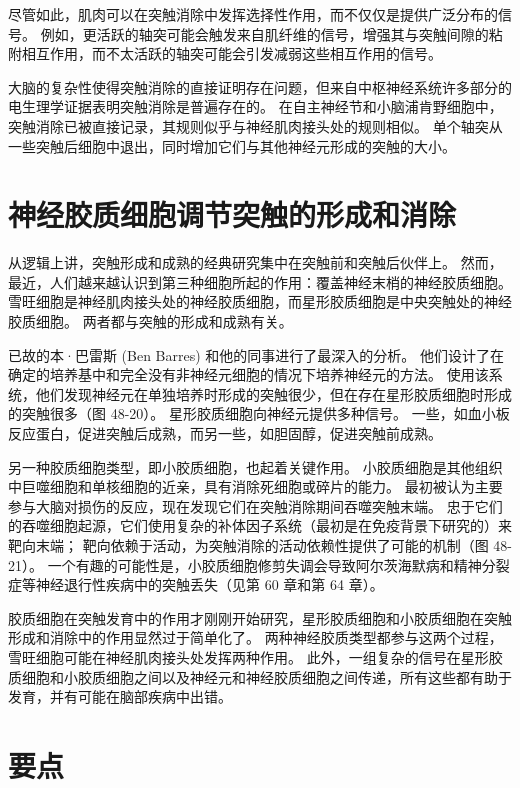 尽管如此，肌肉可以在突触消除中发挥选择性作用，而不仅仅是提供广泛分布的信号。 例如，更活跃的轴突可能会触发来自肌纤维的信号，增强其与突触间隙的粘附相互作用，而不太活跃的轴突可能会引发减弱这些相互作用的信号。

大脑的复杂性使得突触消除的直接证明存在问题，但来自中枢神经系统许多部分的电生理学证据表明突触消除是普遍存在的。 在自主神经节和小脑浦肯野细胞中，突触消除已被直接记录，其规则似乎与神经肌肉接头处的规则相似。 单个轴突从一些突触后细胞中退出，同时增加它们与其他神经元形成的突触的大小。

\section{神经胶质细胞调节突触的形成和消除}
从逻辑上讲，突触形成和成熟的经典研究集中在突触前和突触后伙伴上。 然而，最近，人们越来越认识到第三种细胞所起的作用：覆盖神经末梢的神经胶质细胞。 雪旺细胞是神经肌肉接头处的神经胶质细胞，而星形胶质细胞是中央突触处的神经胶质细胞。 两者都与突触的形成和成熟有关。

已故的本·巴雷斯 (Ben Barres) 和他的同事进行了最深入的分析。 他们设计了在确定的培养基中和完全没有非神经元细胞的情况下培养神经元的方法。 使用该系统，他们发现神经元在单独培养时形成的突触很少，但在存在星形胶质细胞时形成的突触很多（图 48-20）。 星形胶质细胞向神经元提供多种信号。 一些，如血小板反应蛋白，促进突触后成熟，而另一些，如胆固醇，促进突触前成熟。

另一种胶质细胞类型，即小胶质细胞，也起着关键作用。 小胶质细胞是其他组织中巨噬细胞和单核细胞的近亲，具有消除死细胞或碎片的能力。 最初被认为主要参与大脑对损伤的反应，现在发现它们在突触消除期间吞噬突触末端。 忠于它们的吞噬细胞起源，它们使用复杂的补体因子系统（最初是在免疫背景下研究的）来靶向末端； 靶向依赖于活动，为突触消除的活动依赖性提供了可能的机制（图 48-21）。 一个有趣的可能性是，小胶质细胞修剪失调会导致阿尔茨海默病和精神分裂症等神经退行性疾病中的突触丢失（见第 60 章和第 64 章）。

胶质细胞在突触发育中的作用才刚刚开始研究，星形胶质细胞和小胶质细胞在突触形成和消除中的作用显然过于简单化了。 两种神经胶质类型都参与这两个过程，雪旺细胞可能在神经肌肉接头处发挥两种作用。 此外，一组复杂的信号在星形胶质细胞和小胶质细胞之间以及神经元和神经胶质细胞之间传递，所有这些都有助于发育，并有可能在脑部疾病中出错。



\section{要点}


